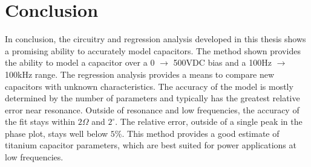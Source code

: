 \section {Conclusion}
\label{sec:conclusion}

In conclusion, the circuitry and regression analysis developed in this thesis shows a promising ability to accurately model capacitors. The method shown provides the ability to model a capacitor over a 0 $\rightarrow$ 500VDC bias and a 100Hz $\rightarrow$ 100kHz range. The regression analysis provides a means to compare new capacitors with unknown characteristics. The accuracy of the model is mostly determined by the number of parameters and typically has the greatest relative error near resonance. Outside of resonance and low frequencies, the accuracy of the fit stays within $2 \Omega$ and $2^{\circ}$. The relative error, outside of a single peak in the phase plot, stays well below $5\%$. This method provides a good estimate of titanium capacitor parameters, which are best suited for power applications  at low frequencies.

